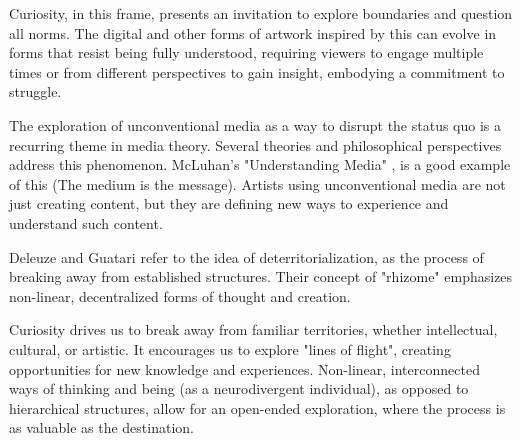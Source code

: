 Curiosity, in this frame, presents an invitation to explore boundaries and question all norms. The digital and other forms of artwork inspired by this can evolve in forms that resist being fully understood, requiring viewers to engage multiple times or from different perspectives to gain insight, embodying a commitment to struggle.

The exploration of unconventional media as a way to disrupt the status quo is a recurring theme in media theory. Several theories and philosophical perspectives address this phenomenon. McLuhan's "Understanding Media" \citep{mcluhan1964}, is a good example of this (The medium is the message). Artists using unconventional media are not just creating content, but they are defining new ways to experience and understand such content.

Deleuze and Guatari refer to the idea of deterritorialization, as the process of breaking away from established structures. Their concept of "rhizome" emphasizes non-linear, decentralized forms of thought and creation. \citep{deleuze1980} 

Curiosity drives us to break away from familiar territories, whether intellectual, cultural, or artistic. It encourages us to explore "lines of flight", creating opportunities for new knowledge and experiences. Non-linear, interconnected ways of thinking and being (as a neurodivergent individual), as opposed to hierarchical structures,  allow for an open-ended exploration, where the process is as valuable as the destination.
